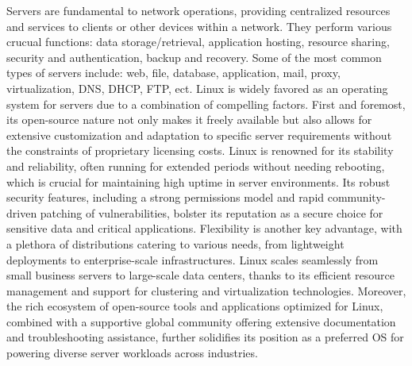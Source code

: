 \documentclass{article}
\begin{document}
	Servers are fundamental to network operations, providing centralized resources and services to clients or other devices within a network. They perform various crucual functions: data storage/retrieval, application hosting, resource sharing, security and authentication, backup and recovery. Some of the most common types of servers include: web, file, database, application, mail, proxy, virtualization, DNS, DHCP, FTP, ect. Linux is widely favored as an operating system for servers due to a combination of compelling factors. First and foremost, its open-source nature not only makes it freely available but also allows for extensive customization and adaptation to specific server requirements without the constraints of proprietary licensing costs. Linux is renowned for its stability and reliability, often running for extended periods without needing rebooting, which is crucial for maintaining high uptime in server environments. Its robust security features, including a strong permissions model and rapid community-driven patching of vulnerabilities, bolster its reputation as a secure choice for sensitive data and critical applications. Flexibility is another key advantage, with a plethora of distributions catering to various needs, from lightweight deployments to enterprise-scale infrastructures. Linux scales seamlessly from small business servers to large-scale data centers, thanks to its efficient resource management and support for clustering and virtualization technologies. Moreover, the rich ecosystem of open-source tools and applications optimized for Linux, combined with a supportive global community offering extensive documentation and troubleshooting assistance, further solidifies its position as a preferred OS for powering diverse server workloads across industries.\\
\end{document}
